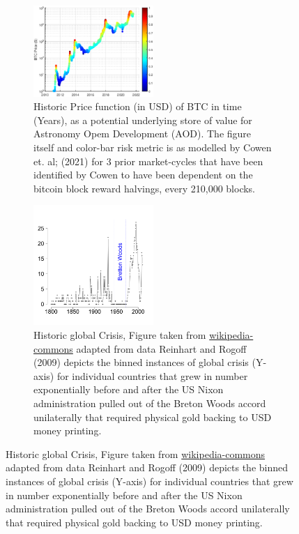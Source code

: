 \documentclass[final,5p,times,twocolumn,authoryear]{elsarticle}
\begin{document}
\begin{figure}[h!]
    \center \begin{figure}[h!]
    \centering
    \label{fig:cowenbtc}
    \caption{Historic Price function (in USD) of BTC in time (Years), as a potential underlying store of value for Astronomy Opem Development (AOD). The figure itself and color-bar risk metric is as modelled by Cowen et. al; (2021) for 3 prior market-cycles that have been identified by Cowen to have been dependent on the bitcoin block reward halvings, every 210,000 blocks.}
  \includegraphics[width=0.5\textwidth]{figs/cowenbtc.eps}
\end{figure}

\begin{figure}[h!]
    \centering
    \label{fig:crisis}
  \caption{Historic global Crisis, Figure taken from \href{https://en.wikipedia.org/wiki/Global_recession}{wikipedia-commons} adapted from data Reinhart and Rogoff (2009) depicts the binned instances of global crisis (Y-axis) for individual countries that grew in number exponentially before and after the US Nixon administration pulled out of the Breton Woods accord unilaterally that required physical gold backing to USD money printing.}
  \includegraphics[width=0.5\textwidth]{figs/330px-BankingCrises.svg.png}
\end{figure}


\end{figure}
\end{document}

